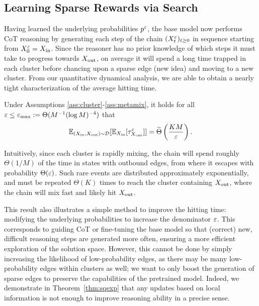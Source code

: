 \subsection{Learning Sparse Rewards via Search}

Having learned the underlying probabilities $p^\varepsilon$, the base model now performs CoT reasoning by generating each step of the chain $(X_t^\varepsilon)_{t\ge 0}$ in sequence starting from $X_0^\varepsilon=X_{\operatorname{in}}$. Since the reasoner has no prior knowledge of which steps it must take to progress towards $X_{\operatorname{out}}$, on average it will spend a long time trapped in each cluster before chancing upon a sparse edge (new idea) and moving to a new cluster. From our quantitative dynamical analysis, we are able to obtain a nearly tight characterization of the average hitting time.

\begin{thm}\label{thm:hitting}
Under Assumptions \ref{ass:cluster}-\ref{ass:metamix}, it holds for all $\varepsilon \le\varepsilon_{\max}:= \Theta(M^{-1}(\log M)^{-4})$ that
\begin{equation*}
\mathbb{E}_{(X_{\operatorname{in}},X_{\operatorname{out}})\sim\mathcal{D}}[\mathbb{E}_{X_{\operatorname{in}}}[\tau_{X_{\operatorname{out}}}^\varepsilon]] = \widetilde{\Theta}\left(\frac{KM}{\varepsilon}\right).
\end{equation*}
\end{thm}

Intuitively, since each cluster is rapidly mixing, the chain will spend roughly $\Theta(1/M)$ of the time in states with outbound edges, from where it escapes with probability $\Theta(\varepsilon)$. Such rare events are distributed approximately exponentially, and must be repeated $\Theta(K)$ times to reach the cluster containing $X_{\operatorname{out}}$, where the chain will mix fast and likely hit $X_{\operatorname{out}}$.

This result also illustrates a simple method to improve the hitting time: modifying the underlying probabilities to increase the denominator $\varepsilon$. This corresponds to guiding CoT or fine-tuning the base model so that (correct) new, difficult reasoning steps are generated more often, ensuring a more efficient exploration of the solution space. However, this cannot be done by simply increasing the likelihood of low-probability edges, as there may be many low-probability edges within clusters as well; we want to only boost the generation of sparse edges to preserve the capabilities of the pretrained model. Indeed, we demonstrate in Theorem~\ref{thm:sqexp} that any updates based on local information is not enough to improve reasoning ability in a precise sense.

